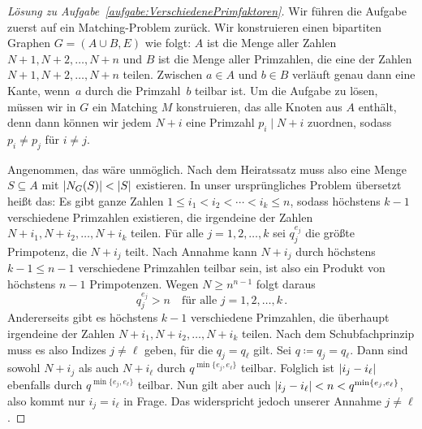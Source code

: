 \begin{proof}[Lösung zu Aufgabe~\ref{aufgabe:VerschiedenePrimfaktoren}]
	Wir führen die Aufgabe zuerst auf ein Matching-Problem zurück. Wir konstruieren einen bipartiten Graphen $G=(A\cup B,E)$ wie folgt: $A$ ist die Menge aller Zahlen $N+1,N+2,\dotsc,N+n$ und $B$ ist die Menge aller Primzahlen, die eine der Zahlen $N+1,N+2,\dotsc,N+n$ teilen. Zwischen $a\in A$ und $b\in B$ verläuft genau dann eine Kante, wenn~$a$ durch die Primzahl~$b$ teilbar ist. Um die Aufgabe zu lösen, müssen wir in $G$ ein Matching $M$ konstruieren, das alle Knoten aus $A$ enthält, denn dann können wir jedem $N+i$ eine Primzahl $p_i\mid N+i$ zuordnen, sodass $p_i\neq p_j$ für $i\neq j$.
	
	Angenommen, das wäre unmöglich. Nach dem Heiratssatz muss also eine Menge $S\subseteq A$ mit $\lvert N_G(S)\rvert<\lvert S\rvert$ existieren. In unser ursprüngliches Problem übersetzt heißt das: Es gibt ganze Zahlen $1\leqslant i_1<i_2<\dotsb<i_k\leqslant n$, sodass höchstens $k-1$ verschiedene Primzahlen existieren, die irgendeine der Zahlen $N+i_1,N+i_2,\dotsc,N+i_k$ teilen. Für alle $j=1,2,\dotsc,k$ sei $q_j^{e_j}$ die größte Primpotenz, die $N+i_j$ teilt. Nach Annahme kann $N+i_j$ durch höchstens $k-1\leqslant n-1$ verschiedene Primzahlen teilbar sein, ist also ein Produkt von höchstens $n-1$ Primpotenzen. Wegen $N\geqslant n^{n-1}$ folgt daraus
	\begin{equation*}
		q_j^{e_j}>n\quad\text{für alle }j=1,2,\dotsc,k\,.
	\end{equation*}
	Andererseits gibt es höchstens $k-1$ verschiedene Primzahlen, die überhaupt irgendeine der Zahlen $N+i_1,N+i_2,\dotsc,N+i_k$ teilen. Nach dem Schubfachprinzip muss es also Indizes $j\neq \ell$ geben, für die $q_j=q_\ell$ gilt. Sei $q\coloneqq q_j=q_\ell$. Dann sind sowohl $N+i_j$ als auch $N+i_\ell$ durch $q^{\min\{e_j,e_\ell\}}$ teilbar. Folglich ist $\lvert i_j-i_\ell\rvert$ ebenfalls durch $q^{\min\{e_j,e_\ell\}}$ teilbar. Nun gilt aber auch $\lvert i_j-i_\ell\rvert<n<q^{\min\{e_j,e_\ell\}}$, also kommt nur $i_j=i_\ell$ in Frage. Das widerspricht jedoch unserer Annahme $j\neq \ell$.
\end{proof}

